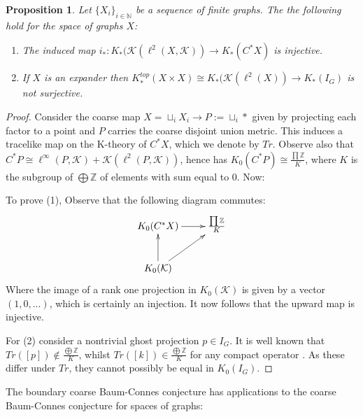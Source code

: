 \documentclass[11pt]{amsart}
\theoremstyle{plain}
\newtheorem{proposition}[theorem]{Proposition}%
\theoremstyle{definition}%
\theoremstyle{remark}%
\begin{document}
\begin{proposition}\label{Prop:Ghost}
Let $\lbrace X_{i} \rbrace_{i\in \mathbb{N}}$ be a sequence of finite graphs. The the following hold for the space of graphs $X$:
\begin{enumerate}
\item The induced map $i_{*}:K_{*}(\mathcal{K}(\ell^{2}(X,\mathcal{K})) \rightarrow K_{*}(C^{*}X)$ is injective.
\item If $X$ is an expander then $K_{*}^{top}(X\times X)\cong K_{*}(\mathcal{K}(\ell^{2}(X)) \rightarrow K_{*}(I_{G})$ is not surjective.
\end{enumerate}
\end{proposition}
\begin{proof}
Consider the coarse map $X=\sqcup_{i} X_{i} \rightarrow P:=\sqcup_{i} \ast$ given by projecting each factor to a point and $P$ carries the coarse disjoint union metric. This induces a tracelike map on the K-theory of $C^{*}X$, which we denote by $Tr$. Observe also that $C^{*}P \cong \ell^{\infty}(P,\mathcal{K})+\mathcal{K}(\ell^{2}(P,\mathcal{K}))$, hence has $K_{0}(C^{*}P) \cong  \frac{\prod\mathbb{Z}}{K}$, where $K$ is the subgroup of $\bigoplus \mathbb{Z}$ of elements with sum equal to 0. Now:

To prove (1), Observe that the following diagram commutes:
\begin{equation*}
\xymatrix{ K_{0}(C^{*}X) \ar[r]& \frac{\prod\mathbb{Z}}{K}\\
K_{0}(\mathcal{K}) \ar[u] \ar[ur] &
}
\end{equation*}
Where the image of a rank one projection in $K_{0}(\mathcal{K})$ is given by a vector $(1,0,...)$, which is certainly an injection. It now follows that the upward map is injective.

For (2) consider a nontrivial ghost projection $p \in I_{G}$. It is well known that $Tr([p]) \not\in \frac{\bigoplus \mathbb{Z}}{K}$, whilst $Tr([k]) \in \frac{\bigoplus\mathbb{Z}}{K}$ for any compact operator \cite{explg1}. As these differ under $Tr$, they cannot possibly be equal in $K_{0}(I_{G})$.
\end{proof}

The boundary coarse Baum-Connes conjecture has applications to the coarse Baum-Connes conjecture for spaces of graphs:
\end{document}
